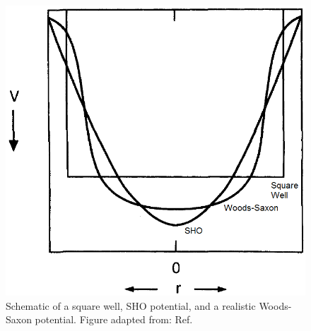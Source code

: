 \begin{figure}[h!]
\label{fig:chp2-SHOPot}
\centerline{\includegraphics[height=0.3\textheight]{./img/c2/sho_approx.png}}
	\caption{Schematic of a square well, SHO potential, and a realistic Woods-Saxon potential. Figure adapted from: Ref.\cite{casten}}
\end{figure}


